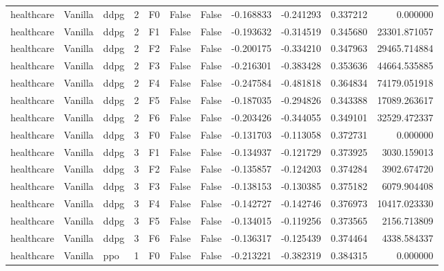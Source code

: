 \begin{tabular}{lllrlllrrrr}
healthcare & Vanilla &      ddpg &     2 &  F0 &           False &            False & -0.168833 & -0.241293 & 0.337212 &         0.000000 \\
healthcare & Vanilla &      ddpg &     2 &  F1 &           False &            False & -0.193632 & -0.314519 & 0.345680 &     23301.871057 \\
healthcare & Vanilla &      ddpg &     2 &  F2 &           False &            False & -0.200175 & -0.334210 & 0.347963 &     29465.714884 \\
healthcare & Vanilla &      ddpg &     2 &  F3 &           False &            False & -0.216301 & -0.383428 & 0.353636 &     44664.535885 \\
healthcare & Vanilla &      ddpg &     2 &  F4 &           False &            False & -0.247584 & -0.481818 & 0.364834 &     74179.051918 \\
healthcare & Vanilla &      ddpg &     2 &  F5 &           False &            False & -0.187035 & -0.294826 & 0.343388 &     17089.263617 \\
healthcare & Vanilla &      ddpg &     2 &  F6 &           False &            False & -0.203426 & -0.344055 & 0.349101 &     32529.472337 \\
healthcare & Vanilla &      ddpg &     3 &  F0 &           False &            False & -0.131703 & -0.113058 & 0.372731 &         0.000000 \\
healthcare & Vanilla &      ddpg &     3 &  F1 &           False &            False & -0.134937 & -0.121729 & 0.373925 &      3030.159013 \\
healthcare & Vanilla &      ddpg &     3 &  F2 &           False &            False & -0.135857 & -0.124203 & 0.374284 &      3902.674720 \\
healthcare & Vanilla &      ddpg &     3 &  F3 &           False &            False & -0.138153 & -0.130385 & 0.375182 &      6079.904408 \\
healthcare & Vanilla &      ddpg &     3 &  F4 &           False &            False & -0.142727 & -0.142746 & 0.376973 &     10417.023330 \\
healthcare & Vanilla &      ddpg &     3 &  F5 &           False &            False & -0.134015 & -0.119256 & 0.373565 &      2156.713809 \\
healthcare & Vanilla &      ddpg &     3 &  F6 &           False &            False & -0.136317 & -0.125439 & 0.374464 &      4338.584337 \\
healthcare & Vanilla &       ppo &     1 &  F0 &           False &            False & -0.213221 & -0.382319 & 0.384315 &         0.000000 \\

\end{tabular}
